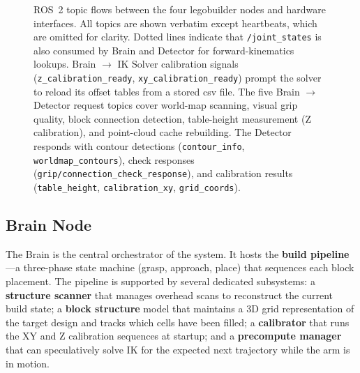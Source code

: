 \begin{figure}[H]
{\begin{tikzpicture}
\end{tikzpicture}%
}
\caption{ROS~2 topic flows between the four legobuilder nodes and hardware interfaces. All topics are shown verbatim except heartbeats, which are omitted for clarity. Dotted lines indicate that \texttt{/joint\_states} is also consumed by Brain and Detector for forward-kinematics lookups. Brain $\to$ IK Solver calibration signals (\texttt{z\_calibration\_ready}, \texttt{xy\_calibration\_ready}) prompt the solver to reload its offset tables from a stored csv file. The five Brain $\to$ Detector request topics cover world-map scanning, visual grip quality, block connection detection, table-height measurement (Z calibration), and point-cloud cache rebuilding. The Detector responds with contour detections (\texttt{contour\_info}, \texttt{worldmap\_contours}), check responses (\texttt{grip/connection\_check\_response}), and calibration results (\texttt{table\_height}, \texttt{calibration\_xy}, \texttt{grid\_coords}).}
\label{fig:ros_architecture}
\end{figure}

\subsection{Brain Node}

\noindent The Brain is the central orchestrator of the system. It hosts the \textbf{build pipeline}---a three-phase state machine (grasp, approach, place) that sequences each block placement. The pipeline is supported by several dedicated subsystems: a \textbf{structure scanner} that manages overhead scans to reconstruct the current build state; a \textbf{block structure} model that maintains a 3D grid representation of the target design and tracks which cells have been filled; a \textbf{calibrator} that runs the XY and Z calibration sequences at startup; and a \textbf{precompute manager} that can speculatively solve IK for the expected next trajectory while the arm is in motion.

